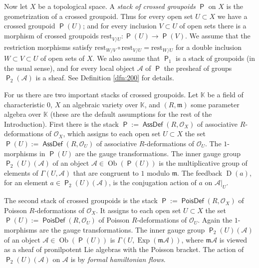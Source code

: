 \documentclass[a4paper, 10pt]{amsart}
\theoremstyle{definition}
\numberwithin{equation}{section}
\newcommand{\opn}{\operatorname}
\newcommand{\cat}[1]{\operatorname{\mathsf{#1}}}
\newcommand{\mfrak}[1]{\mathfrak{#1}}
\newcommand{\mcal}[1]{\mathcal{#1}}
\newcommand{\mrm}[1]{\mathrm{#1}}
\newcommand{\mbb}[1]{\mathbb{#1}}
\newcommand{\bsym}[1]{\boldsymbol{#1}}
\newcommand{\K}{\mbb{K}}
\newcommand{\m}{\mfrak{m}}
\newcommand{\OX}{\mcal{O}_X}
\newcommand{\twocat}[1]{\operatorname{\bsym{\cat{#1}}}}
\begin{document}
Now let $X$ be a topological space. A {\em stack of crossed groupoids}
$\twocat{P}$ on $X$ is the geometrization of a crossed groupoid.
Thus for every open set $U \subset X$ we have a crossed groupoid
$\twocat{P}(U)$; and for every inclusion $V \subset U$ of open sets there is a
morphism of crossed groupoids
$\mrm{rest}^{}_{V / U} : \twocat{P}(U) \to \twocat{P}(V)$. 
We  assume that the restriction morphisms satisfy 
$\mrm{rest}^{}_{W / V} \circ \mrm{rest}^{}_{V / U} = \mrm{rest}^{}_{W / U}$
for a double inclusion $W \subset V \subset U$ of open sets of $X$.
We also assume that $\twocat{P}_1$ is a stack of groupoids (in the usual
sense), and for every local object 
$\mcal{A}$ of $\twocat{P}$ the presheaf of groups 
$\twocat{P}_2(\mcal{A})$ is a sheaf. 
See Definition \ref{dfn:200} for details.

For us there are two important stacks of crossed groupoids. 
Let $\K$ be a field of characteristic $0$,
$X$ an algebraic variety over $\K$, and $(R, \m)$ some parameter
algebra over $\K$  (these are the default assumptions for the rest of the
Introduction). First there is the stack
$\twocat{P} := \twocat{AssDef}(R, \mcal{O}_X)$ of associative $R$-deformations
of $\mcal{O}_X$, which assigns to each open set $U \subset X$ the set
$\twocat{P}(U) := \cat{AssDef}(R, \mcal{O}_U)$ of associative 
$R$-deformations of $\mcal{O}_U$. The $1$-morphisms in $\twocat{P}(U)$ are the
gauge transformations. The inner gauge group 
$\twocat{P}_2(U)(\mcal{A})$ of an 
object $\mcal{A} \in \opn{Ob}(\twocat{P}(U))$ is the
multiplicative group of elements of $\Gamma(U, \mcal{A})$ that are congruent to
$1$ modulo $\m$. The feedback $\opn{D}(a)$, for an element 
$a \in \twocat{P}_2(U)(\mcal{A})$, 
is the conjugation action of $a$ on $\mcal{A}|_U$.

The second stack of crossed groupoids is the stack
$\twocat{P} := \twocat{PoisDef}(R, \mcal{O}_X)$ of Poisson
$R$-deformations of $\OX$. It assigns to each open set $U \subset X$
the set $\twocat{P}(U) := \cat{PoisDef}(R, \mcal{O}_U)$ of Poisson
$R$-deformations of $\mcal{O}_U$. Again the $1$-morphisms are the gauge
transformations. The inner gauge group $\twocat{P}_2(U)(\mcal{A})$ of an
object $\mcal{A} \in \opn{Ob}(\twocat{P}(U))$
is $\Gamma(U, \opn{Exp}(\m \mcal{A}))$, 
where $\m \mcal{A}$ is viewed as a sheaf of pronilpotent Lie
algebras with the Poisson bracket. The action of $\twocat{P}_2(U)(\mcal{A})$  on
$\mcal{A}$ is by {\em formal hamiltonian flows}. 
\end{document}
